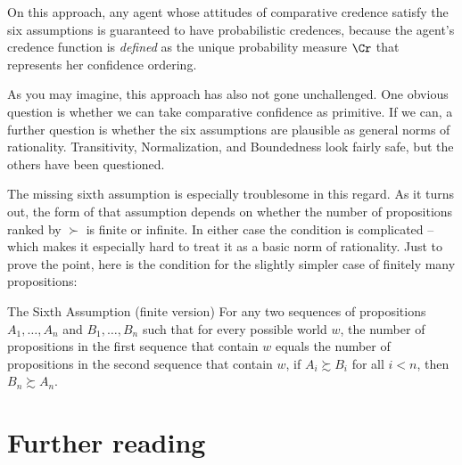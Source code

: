 On this approach, any agent whose attitudes of comparative credence
satisfy the six assumptions is guaranteed to have probabilistic
credences, because the agent's credence function is \emph{defined} as
the unique probability measure $\Cr$ that represents her confidence
ordering.

As you may imagine, this approach has also not gone unchallenged. One
obvious question is whether we can take comparative confidence as
primitive. If we can, a further question is whether the six
assumptions are plausible as general norms of
rationality. Transitivity, Normalization, and Boundedness look fairly
safe, but the others have been questioned. 

The missing sixth assumption is especially troublesome in this
regard. As it turns out, the form of that assumption depends on
whether the number of propositions ranked by $\succ$ is finite or
infinite. In either case the condition is complicated -- which makes
it especially hard to treat it as a basic norm of rationality. Just to
prove the point, here is the condition for the slightly simpler case
of finitely many propositions:

\begin{genericthm}{The Sixth Assumption (finite version)}
  For any two sequences of propositions $A_1,\ldots,A_n$ and
  $B_1,\ldots,B_n$ such that for every possible world $w$, the number of
  propositions in the first sequence that contain $w$ equals the
  number of propositions in the second sequence that contain $w$, if
  $A_i \succsim B_i$ for all $i < n$, then $B_n \succsim A_n$.
\end{genericthm}

%



\section{Further reading}

